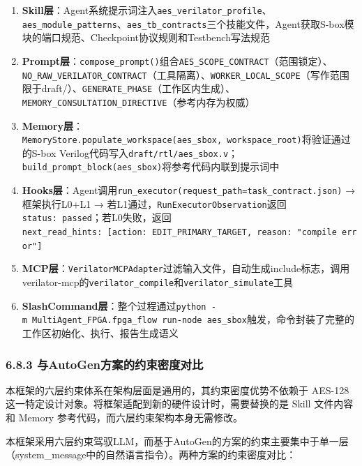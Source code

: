 \begin{enumerate}
\def\labelenumi{\arabic{enumi}.}
\tightlist
\item
  \textbf{Skill层}：Agent系统提示词注入\texttt{aes\_verilator\_profile}、\texttt{aes\_module\_patterns}、\texttt{aes\_tb\_contracts}三个技能文件，Agent获取S-box模块的端口规范、Checkpoint协议规则和Testbench写法规范
\item
  \textbf{Prompt层}：\texttt{compose\_prompt()}组合\texttt{AES\_SCOPE\_CONTRACT}（范围锁定）、\texttt{NO\_RAW\_VERILATOR\_CONTRACT}（工具隔离）、\texttt{WORKER\_LOCAL\_SCOPE}（写作范围限于draft/）、\texttt{GENERATE\_PHASE}（工作区内生成）、\texttt{MEMORY\_CONSULTATION\_DIRECTIVE}（参考内存为权威）
\item
  \textbf{Memory层}：\texttt{MemoryStore.populate\_workspace(\textquotesingle{}aes\_sbox\textquotesingle{},\ workspace\_root)}将验证通过的S-box
  Verilog代码写入\texttt{draft/rtl/aes\_sbox.v}；\texttt{build\_prompt\_block(\textquotesingle{}aes\_sbox\textquotesingle{})}将参考代码内联到提示词中
\item
  \textbf{Hooks层}：Agent调用\texttt{run\_executor(request\_path=task\_contract.json)}
  → 框架执行L0+L1 →
  若L1通过，\texttt{RunExecutorObservation}返回\texttt{status:\ passed}；若L0失败，返回\texttt{next\_read\_hints:\ {[}action:\ EDIT\_PRIMARY\_TARGET,\ reason:\ "compile\ error"{]}}
\item
  \textbf{MCP层}：\texttt{VerilatorMCPAdapter}过滤输入文件，自动生成include标志，调用verilator-mcp的\texttt{verilator\_compile}和\texttt{verilator\_simulate}工具
\item
  \textbf{SlashCommand层}：整个过程通过\texttt{python\ -m\ MultiAgent\_FPGA.fpga\_flow\ run-node\ aes\_sbox}触发，命令封装了完整的工作区初始化、执行、报告生成语义
\end{enumerate}

\subsubsection{6.8.3
与AutoGen方案的约束密度对比}\label{ux4e0eautogenux65b9ux6848ux7684ux7ea6ux675fux5bc6ux5ea6ux5bf9ux6bd4}

本框架的六层约束体系在架构层面是通用的，其约束密度优势不依赖于 AES-128
这一特定设计对象。将框架适配到新的硬件设计时，需要替换的是 Skill
文件内容和 Memory 参考代码，而六层约束架构本身无需修改。

本框架采用六层约束驾驭LLM，而基于AutoGen的方案的约束主要集中于单一层（system\_message中的自然语言指令）。两种方案的约束密度对比：


